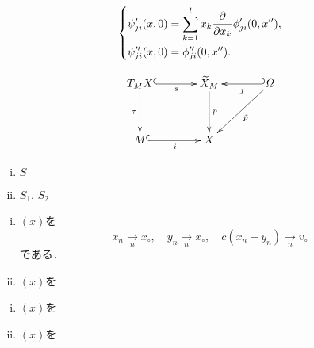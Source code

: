 \begin{equation}
    \begin{dcases}
        \psi'_{ji}(x,0)=\sum_{k=1}^{l}x_k\frac{\partial}{\partial x_k}\phi'_{ji}(0,x''),\\
        \psi''_{ji}(x,0)=\phi''_{ji}(0,x'').
    \end{dcases}
\end{equation}

\begin{equation}\label{eq415}
    \vcenter{\xymatrix@C=36pt@R=36pt{
    T_{M}X
    \ar[d]_-{\tau}
    \ar@{^{(}->}[r]_-{s}
    &
    \widetilde{X}_{M}
    \ar[d]^-{p}
    &
    \varOmega
    \ar[ld]^-{\tilde{p}}
    \ar@{_{(}->}[l]^-{j}
    \\
    M
    \ar@{^{(}->}[r]_-{i}
    &
    X
  }}
\end{equation}

\begin{DFN}
    \begin{enumerate}[(i)]
        \item \(S\)
        \item \(S_1\), \(S_2\)
    \end{enumerate}
\end{DFN}

\begin{leftbar}
\begin{PRP}
    \begin{enumerate}[(i)]\setcounter{equation}{6}
        \item \((x)\)を\begin{equation}
            x_n\underset{n}{\longrightarrow}x_{\circ},\quad
            y_n\underset{n}{\longrightarrow}x_{\circ},\quad
            c(x_n-y_n)\underset{n}{\longrightarrow}v_{\circ}
        \end{equation}
        である．\footnotemark[1]
        \item \((x)\)を
    \end{enumerate}
\end{PRP}
\end{leftbar}
\setcounter{footnote}{1}
\begin{leftbar}
\begin{PRP}\label{prp413}
    \begin{enumerate}[(i)]
        \item \((x)\)を
        \item \((x)\)を
    \end{enumerate}
\end{PRP}
\end{leftbar}
    
